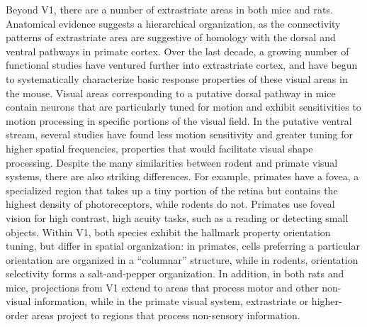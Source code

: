 Beyond V1, there are a number of extrastriate areas in both mice\cite{Andermann2011, Marshel2011, Juavinett2017} and rats\cite{Espinoza1983RetinotopicRat, Coogan1993}. Anatomical evidence suggests a hierarchical organization\cite{Wang2007, Wang2011GatewaysCortex}, as the connectivity patterns of extrastriate area are suggestive of homology with the dorsal and ventral pathways in primate cortex. Over the last decade, a growing number of functional studies have ventured further into extrastriate cortex, and have begun to systematically characterize basic response properties of these visual areas in the mouse\cite{Andermann2011, Marshel2011, Glickfeld2013, Glickfeld2017, DeVries2019, Siegle2021}. Visual areas corresponding to a putative dorsal pathway in mice contain neurons that are particularly tuned for motion\cite{Andermann2011, Marshel2011, Glickfeld2013} and exhibit sensitivities to motion processing in specific portions of the visual field\cite{Sit2020}. In the putative ventral stream, several studies have found less motion sensitivity and greater tuning for higher spatial frequencies\cite{Glickfeld2013, Tohmi2014TheMice}, properties that would facilitate visual shape processing. 
% 
Despite the many similarities between rodent and primate visual systems, there are also striking differences. For example, primates have a fovea, a specialized region that takes up a tiny portion of the retina but contains the highest density of photoreceptors\cite{Perry1985}, while rodents do not. Primates use foveal vision for high contrast, high acuity tasks, such as a reading or detecting small objects. Within V1, both species exhibit the hallmark property orientation tuning, but differ in spatial organization: in primates, cells preferring a particular orientation are organized in a ``columnar'' structure, while in rodents, orientation selectivity forms a salt-and-pepper organization\cite{Ohki2005}. In addition, in both rats and mice, projections from V1 extend to areas that process motor and other non-visual information, while in the primate visual system, extrastriate or higher-order areas project to regions that process non-sensory information. 

